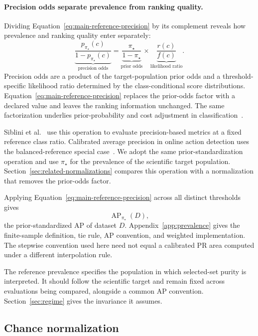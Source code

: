 \documentclass[11pt]{article}
\newcommand{\AP}{\operatorname{AP}}
\theoremstyle{remark}
\begin{document}
\paragraph{Precision odds separate prevalence from ranking quality.}
Dividing Equation~\eqref{eq:main-reference-precision} by its complement reveals how prevalence and ranking quality enter separately:
\begin{equation}
\underbrace{\frac{p_{\pi_\star}(c)}{1-p_{\pi_\star}(c)}}_{\text{precision odds}}
=
\underbrace{\frac{\pi_\star}{1-\pi_\star}}_{\text{prior odds}}
\times
\underbrace{\frac{r(c)}{f(c)}}_{\text{likelihood ratio}}.
\label{eq:odds}
\end{equation}
Precision odds are a product of the target-population prior odds and a threshold-specific likelihood ratio determined by the class-conditional score distributions. Equation~\eqref{eq:main-reference-precision} replaces the prior-odds factor with a declared value and leaves the ranking information unchanged. The same factorization underlies prior-probability and cost adjustment in classification~\cite{elkan2001foundations}.

Siblini et al.~\cite{siblini2020calibration} use this operation to evaluate precision-based metrics at a fixed reference class ratio. Calibrated average precision in online action detection uses the balanced-reference special case~\cite{degeest2016online}. We adopt the same prior-standardization operation and use $\pi_\star$ for the prevalence of the scientific target population. Section~\ref{sec:related-normalizations} compares this operation with a normalization that removes the prior-odds factor.

Applying Equation~\eqref{eq:main-reference-precision} across all distinct thresholds gives
\[
\AP_{\pi_\star}(D),
\]
the prior-standardized AP of dataset $D$. Appendix~\ref{app:prevalence} gives the finite-sample definition, tie rule, AP convention, and weighted implementation. The stepwise convention used here need not equal a calibrated PR area computed under a different interpolation rule.

The reference prevalence specifies the population in which selected-set purity is interpreted. It should follow the scientific target and remain fixed across evaluations being compared, alongside a common AP convention. Section~\ref{sec:regime} gives the invariance it assumes.

\subsection{Chance normalization}
\end{document}

